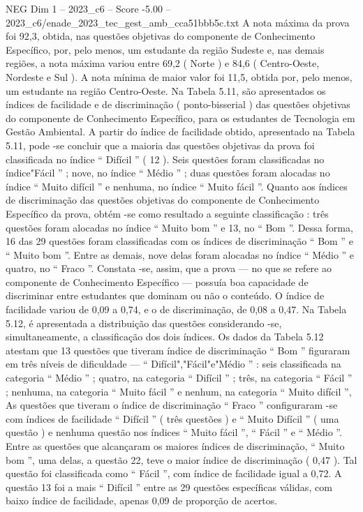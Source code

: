 \begin{textsample}{NEG Dim 1 – 2023\_c6 – Score -5.00 – 2023\_c6/enade\_2023\_tec\_gest\_amb\_cca51bbb5c.txt}
A nota máxima da prova foi 92,3, obtida, nas questões objetivas do componente de Conhecimento Específico, por, pelo menos, um estudante da região Sudeste e, nas demais regiões, a nota máxima variou entre 69,2 ( Norte ) e 84,6 ( Centro-Oeste, Nordeste e Sul ).
A nota mínima de maior valor foi 11,5, obtida por, pelo menos, um estudante na região Centro-Oeste.
Na Tabela 5.11, são apresentados os índices de facilidade e de discriminação ( ponto-bisserial ) das questões objetivas do componente de Conhecimento Específico, para os estudantes de Tecnologia em Gestão Ambiental.
A partir do índice de facilidade obtido, apresentado na Tabela 5.11, pode -se concluir que a maioria das questões objetivas da prova foi classificada no índice “ Difícil ” ( 12 ).
Seis questões foram classificadas no índice"Fácil ” ; nove, no índice “ Médio ” ; duas questões foram alocadas no índice “ Muito difícil ” e nenhuma, no índice “ Muito fácil ”.
Quanto aos índices de discriminação das questões objetivas do componente de Conhecimento Específico da prova, obtém -se como resultado a seguinte classificação : três questões foram alocadas no índice “ Muito bom ” e 13, no “ Bom ”.
Dessa forma, 16 das 29 questões foram classificadas com os índices de discriminação “ Bom ” e “ Muito bom ”.
Entre as demais, nove delas foram alocadas no índice “ Médio ” e quatro, no “ Fraco ”.
Constata -se, assim, que a prova — no que se refere ao componente de Conhecimento Específico — possuía boa capacidade de discriminar entre estudantes que dominam ou não o conteúdo.
O índice de facilidade variou de 0,09 a 0,74, e o de discriminação, de 0,08 a 0,47.
Na Tabela 5.12, é apresentada a distribuição das questões considerando -se, simultaneamente, a classificação dos dois índices.
Os dados da Tabela 5.12 atestam que 13 questões que tiveram índice de discriminação “ Bom ” figuraram em três níveis de dificuldade — “ Difícil","Fácil"e"Médio ” : seis classificada na categoria “ Médio ” ; quatro, na categoria “ Difícil ” ; três, na categoria “ Fácil ” ; nenhuma, na categoria “ Muito fácil ” e nenhum, na categoria “ Muito difícil ”, As questões que tiveram o índice de discriminação “ Fraco ” configuraram -se com índices de facilidade “ Difícil ” ( três questões ) e “ Muito Difícil ” ( uma questão ) e nenhuma questão nos índices “ Muito fácil ”, “ Fácil ” e “ Médio ”.
Entre as questões que alcançaram os maiores índices de discriminação, “ Muito bom ”, uma delas, a questão 22, teve o maior índice de discriminação ( 0,47 ).
Tal questão foi classificada como “ Fácil ”, com índice de facilidade igual a 0,72.
A questão 13 foi a mais “ Difícil ” entre as 29 questões específicas válidas, com baixo índice de facilidade, apenas 0,09 de proporção de acertos.

\end{textsample}
